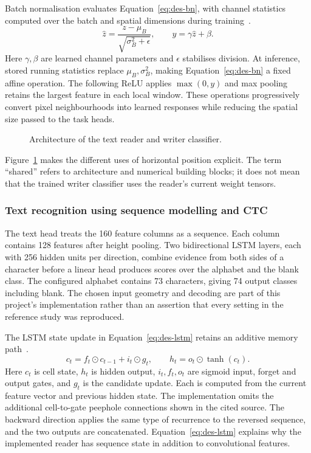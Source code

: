 Batch normalisation evaluates Equation~\ref{eq:des-bn}, with channel statistics computed over the batch and spatial dimensions during training~\cite[PDF pp.~4--5, Alg.~1]{ioffe2015}.
\begin{equation}
\widehat z=\frac{z-\mu_B}{\sqrt{\sigma_B^2+\epsilon}},\qquad
y=\gamma\widehat z+\beta.
\label{eq:des-bn}
\end{equation}
Here $\gamma,\beta$ are learned channel parameters and $\epsilon$ stabilises division. At inference, stored running statistics replace $\mu_B,\sigma_B^2$, making Equation~\ref{eq:des-bn} a fixed affine operation. The following ReLU applies $\max(0,y)$ and max pooling retains the largest feature in each local window. These operations progressively convert pixel neighbourhoods into learned responses while reducing the spatial size passed to the task heads.

\begin{figure}[!htbp]\centering
{}
\caption{Architecture of the text reader and writer classifier.}
\label{fig:des-network}
\end{figure}
Figure~\ref{fig:des-network} makes the different uses of horizontal position explicit. The term ``shared'' refers to architecture and numerical building blocks; it does not mean that the trained writer classifier uses the reader's current weight tensors.

\subsubsection{Text recognition using sequence modelling and CTC}
The text head treats the 160 feature columns as a sequence. Each column contains 128 features after height pooling. Two bidirectional LSTM layers, each with 256 hidden units per direction, combine evidence from both sides of a character before a linear head produces scores over the alphabet and the blank class. The configured alphabet contains 73 characters, giving 74 output classes including blank. The chosen input geometry and decoding are part of this project's implementation rather than an assertion that every setting in the reference study was reproduced.

The LSTM state update in Equation~\ref{eq:des-lstm} retains an additive memory path~\cite[p.~5, Eqs.~(9)--(11)]{graves2013}.
\begin{equation}
c_t=f_t\odot c_{t-1}+i_t\odot g_t,\qquad
h_t=o_t\odot\tanh(c_t).
\label{eq:des-lstm}
\end{equation}
Here $c_t$ is cell state, $h_t$ is hidden output, $i_t,f_t,o_t$ are sigmoid input, forget and output gates, and $g_t$ is the candidate update. Each is computed from the current feature vector and previous hidden state. The implementation omits the additional cell-to-gate peephole connections shown in the cited source. The backward direction applies the same type of recurrence to the reversed sequence, and the two outputs are concatenated. Equation~\ref{eq:des-lstm} explains why the implemented reader has sequence state in addition to convolutional features.

